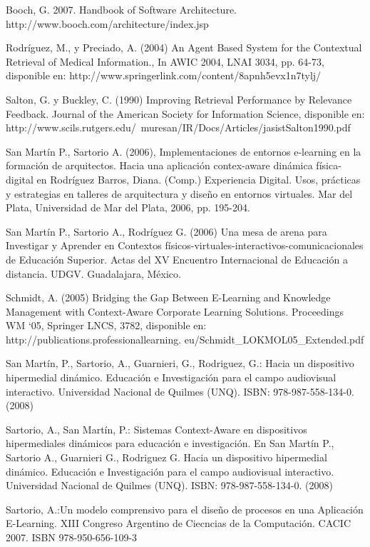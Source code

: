 \begin{thebibliography}{1}
Booch, G. 2007. Handbook of Software Architecture. http://www.booch.com/architecture/index.jsp


\bibitem{} 
Rodríguez, M., y Preciado, A. (2004) An Agent Based System for the Contextual
Retrieval of Medical Information., In AWIC 2004, LNAI 3034, pp. 64-73,
disponible en: http://www.springerlink.com/content/8apnh5evx1n7tylj/

\bibitem{} 
Salton, G. y Buckley, C. (1990) Improving Retrieval Performance by Relevance
Feedback. Journal of the American Society for Information Science, disponible
en: http://www.scils.rutgers.edu/~muresan/IR/Docs/Articles/jasistSalton1990.pdf

\bibitem{} 
San Martín P., Sartorio A. (2006), Implementaciones de entornos e-learning en la
formación de arquitectos. Hacia una aplicación contex-aware dinámica
física-digital en Rodríguez Barros, Diana. (Comp.) Experiencia Digital. Usos,
prácticas y estrategias en talleres de arquitectura y diseño en entornos
virtuales. Mar del Plata, Universidad de Mar del Plata, 2006, pp. 195-204.

\bibitem{} 
San Martín P., Sartorio A., Rodríguez G. (2006) Una mesa de arena para
Investigar y Aprender en
Contextos físicos-virtuales-interactivos-comunicacionales de Educación Superior.
Actas del XV Encuentro Internacional de Educación a distancia. UDGV.
Guadalajara, México.

\bibitem{} 
Schmidt, A. (2005) Bridging the Gap Between E-Learning and Knowledge Management
with Context-Aware Corporate Learning Solutions. Proceedings WM ‘05, Springer
LNCS, 3782, disponible en: http://publications.professionallearning.
eu/Schmidt_LOKMOL05_Extended.pdf


San Martín, P., Sartorio, A., Guarnieri, G., Rodriguez, G.: {Hacia un
dispositivo hipermedial dinámico. Educación e Investigación para el campo
audiovisual interactivo. Universidad Nacional de Quilmes (UNQ). ISBN:
978-987-558-134-0. (2008)}

Sartorio, A., San Martín, P.: {Sistemas Context-Aware en dispositivos
hipermediales dinámicos para educación e investigación. En San Martín P.,
Sartorio A., Guarnieri G., Rodriguez G. Hacia un dispositivo hipermedial
dinámico. Educación e Investigación para el campo audiovisual interactivo.
Universidad Nacional de Quilmes (UNQ). ISBN: 978-987-558-134-0. (2008)}

Sartorio, A.:{Un modelo comprensivo para el diseño de procesos en una
Aplicación E-Learning. XIII Congreso Argentino de Ciecncias de la Computación.
CACIC 2007. ISBN 978-950-656-109-3}


\end{thebibliography}
